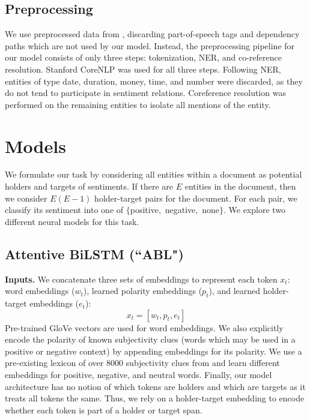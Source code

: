\documentclass[11pt,a4paper]{article}
\begin{document}
\subsection{Preprocessing}
We use preprocessed data from \citet{Choi:16}, discarding part-of-speech tags and dependency paths which are not used by our model.
Instead, the preprocessing pipeline for our model consists of only three steps: tokenization, NER, and co-reference resolution.
Stanford CoreNLP \citep{Manning:14} was used for all three steps.
Following NER, entities of type date, duration, money, time, and number were discarded, as they do not tend to participate in sentiment relations.
Coreference resolution was performed on the remaining entities to isolate all mentions of the entity.

\section{Models}
We formulate our task by considering all entities within a document as potential holders and targets of sentiments. If there are $E$ entities in the document, then we consider $E(E - 1)$ holder-target pairs for the document.
For each pair, we classify its sentiment into one of $\{$positive$,$ negative$,$ none$\}$.
We explore two different neural models for this task.

\subsection{Attentive BiLSTM (``ABL")}

\noindent\textbf{Inputs.}
We concatenate three sets of embeddings to represent each token $x_t$: word embeddings ($w_t$), learned polarity embeddings ($p_t$), and learned holder-target embeddings ($e_t$):
	$$x_t = [w_t, p_t, e_t]$$
Pre-trained GloVe vectors \citep{Pennington:14} are used for word embeddings.
We also explicitly encode the polarity of known subjectivity clues (words which may be used in a positive or negative context) by appending embeddings for its polarity.
We use a pre-existing lexicon of over 8000 subjectivity clues from \citet{Wilson:05} and learn different embeddings for positive, negative, and neutral words.
Finally, our model architecture has no notion of which tokens are holders and which are targets as it treats all tokens the same.
Thus, we rely on a holder-target embedding to encode whether each token is part of a holder or target span.
\end{document}
